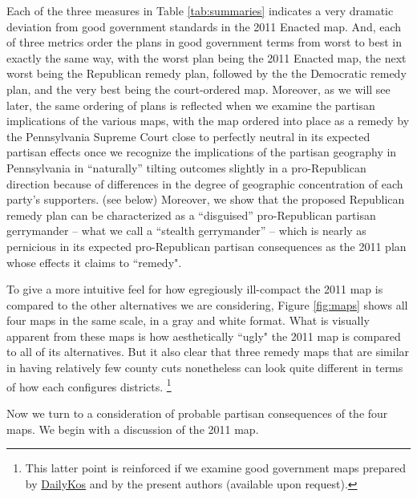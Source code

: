 \par
    Each of the three measures in Table \ref{tab:summaries} indicates a very dramatic deviation from good government standards in the 2011 Enacted map. And, each of three metrics order the plans in good government terms from worst to best in exactly the same way, with the worst plan being the 2011 Enacted map, the next worst being the Republican remedy plan, followed by the the Democratic remedy plan, and the very best being the court-ordered map. Moreover, as we will see later, the same ordering of plans is reflected when we examine the partisan implications of the various maps, with the map ordered into place as a remedy by the Pennsylvania Supreme Court close to perfectly neutral in its expected partisan effects once we recognize the implications of the partisan geography in Pennsylvania in ``naturally” tilting outcomes slightly in a pro-Republican direction because of differences in the degree of geographic concentration of each party’s supporters. (see below) Moreover, we show that the proposed Republican remedy plan can be characterized as a ``disguised” pro-Republican partisan gerrymander -- what we call a ``stealth gerrymander” -- which is nearly as pernicious in its expected pro-Republican partisan consequences as the 2011 plan whose effects it claims to ``remedy".
\par
    To give a more intuitive feel for how egregiously ill-compact the 2011 map is compared to the other alternatives we are considering, Figure \ref{fig:maps} shows all four maps in the same scale, in a gray and white format. What is visually apparent from these maps is how aesthetically ``ugly" the 2011 map is compared to all of its alternatives. But it also clear that three remedy maps that are similar in having relatively few county cuts nonetheless can look quite different in terms of how each configures districts.
        \footnote{This latter point is reinforced if we examine good government maps prepared by \href{https://www.dailykos.com/stories/2018/2/8/1739648/-Pennsylvania-will-soon-redraw-its-House-map-to-end-GOP-gerrymandering-How-would-you-draw-the-lines}{DailyKos} and by the present authors (available upon request).}
%
\par
    Now we turn to a consideration of probable partisan consequences of the four maps. We begin with a discussion of the 2011 map.
\par
